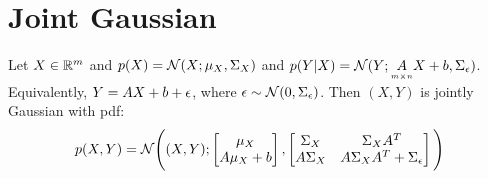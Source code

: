 \section{Joint Gaussian}
Let $X \in \mathbb{R}^m$ and $p(X) = \mathcal{N}(X; \mu_X, \Sigma_{X})$ and $p(Y|X) = \mathcal{N}(Y; \underset{\scriptscriptstyle m \times n}{A} X + b, \Sigma_{\epsilon})$. Equivalently, $Y = A X + b + \epsilon$, where $\epsilon \sim \mathcal{N}(0, \Sigma_{\epsilon})$. Then $(X, Y)$ is jointly Gaussian with pdf:
\begin{align}
	p(X, Y) = \mathcal{N}\Bigg((X, Y); \begin{bmatrix}\mu_X \\ A \mu_X + b \end{bmatrix}, 
	                            \begin{bmatrix}\Sigma_{X} &  \Sigma_{X} A^T \\ A \Sigma_{X} & A \Sigma_{X} A^T + \Sigma_{\epsilon} \end{bmatrix} \Bigg
	                            )
\end{align}
